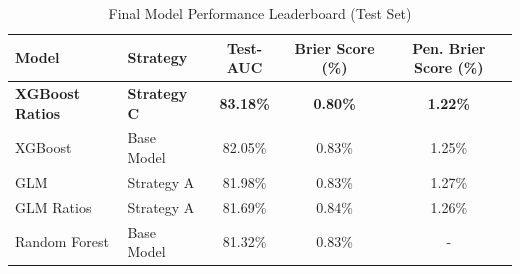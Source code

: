 \documentclass{report}\usepackage[]{graphicx}\usepackage[]{xcolor}
\begin{document}
\begin{table}[h]
    \centering
    \caption{Final Model Performance Leaderboard (Test Set)}
    \label{tab:final_leaderboard}
    \begin{tabular}{llccc}
        \hline
        \textbf{Model} & \textbf{Strategy} & \textbf{Test-AUC} & \textbf{Brier Score (\%)} & \textbf{Pen. Brier Score (\%)} \\
        \hline
        \textbf{XGBoost Ratios} & \textbf{Strategy C} & \textbf{83.18\%} & \textbf{0.80\%} & \textbf{1.22\%} \\
        XGBoost & Base Model & 82.05\% & 0.83\% & 1.25\% \\
        GLM & Strategy A & 81.98\% & 0.83\% & 1.27\% \\
        GLM Ratios & Strategy A & 81.69\% & 0.84\% & 1.26\% \\
        Random Forest & Base Model & 81.32\% & 0.83\% & - \\
        \hline
    \end{tabular}
\end{table}




\end{document}
